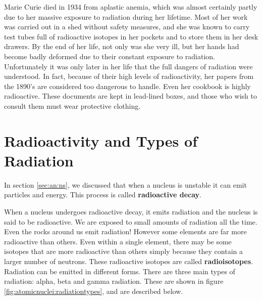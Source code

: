\begin{IFact}
{Marie Curie died in 1934 from aplastic anemia, which was almost certainly partly due to her massive exposure to radiation during her lifetime. Most of her work was carried out in a shed without safety measures, and she was known to carry test tubes full of radioactive isotopes in her pockets and to store them in her desk drawers. By the end of her life, not only was she very ill, but her hands had become badly deformed due to their constant exposure to radiation. Unfortunately it was only later in her life that the full dangers of radiation were understood. In fact, because of their high levels of radioactivity, her papers from the 1890's are considered too dangerous to handle. Even her cookbook is highly radioactive. These documents are kept in lead-lined boxes, and those who wish to consult them must wear protective clothing. }
\end{IFact}






\section{Radioactivity and Types of Radiation}
\label{sec:an:r}

In section \ref{sec:an:ns}, we discussed that when a nucleus is unstable it can emit particles and energy. This process is called \textbf{radioactive decay}.


When a nucleus undergoes radioactive decay, it emits radiation and the nucleus is said to be radioactive. We are exposed to small amounts of radiation all the time. Even the rocks around us emit radiation! However some elements are far more radioactive than others. Even within a single element, there may be some isotopes that are more radioactive than others simply because they contain a larger number of neutrons. These radioactive isotopes are called \textbf{radioisotopes}.\\

Radiation can be emitted in different forms. There are three main types of radiation: alpha, beta and gamma
radiation. These are shown in figure \ref{fig:atomicnuclei:radiationtypes}, and are described below.\\

